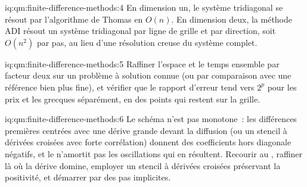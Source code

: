 \begin{solution}{iq:qm:finite-difference-methods:4}
En dimension un, le système tridiagonal se résout par l'algorithme de Thomas en $O(n)$. En dimension deux, la méthode ADI résout un système tridiagonal par ligne de grille et par direction, soit $O(n^2)$ par pas, au lieu
d'une résolution creuse du système complet.
\end{solution}

\begin{solution}{iq:qm:finite-difference-methods:5}
Raffiner l'espace et le temps ensemble par facteur deux sur un problème à solution connue (ou par comparaison avec une référence bien plus fine), et vérifier que le rapport d'erreur tend vers $2^p$ pour les prix et les grecques séparément,
en des points qui restent sur la grille.
\end{solution}

\begin{solution}{iq:qm:finite-difference-methods:6}
Le schéma n'est pas monotone~: les différences premières centrées avec une dérive grande devant la diffusion (ou un stencil à dérivées croisées avec forte corrélation) donnent des coefficients hors diagonale négatifs, et
le  n'amortit pas les oscillations qui en résultent. Recourir au , raffiner là où la dérive domine, employer un stencil à dérivées croisées préservant la positivité, et démarrer par des pas implicites.
\end{solution}
